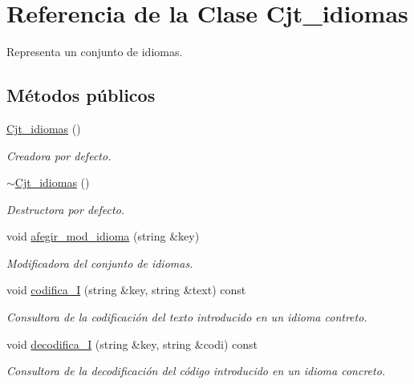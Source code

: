 \hypertarget{class_cjt__idiomas}{}\section{Referencia de la Clase Cjt\+\_\+idiomas}
\label{class_cjt__idiomas}


Representa un conjunto de idiomas.  


\subsection*{Métodos públicos}
\begin{DoxyCompactItemize}
\item 
\hyperlink{class_cjt__idiomas_acf95ab4c8f5fc442e3724a804658dd38}{Cjt\+\_\+idiomas} ()
\begin{DoxyCompactList}\small\item\em Creadora por defecto. \end{DoxyCompactList}\item 
\hyperlink{class_cjt__idiomas_acd4deb8546959ab728ce5c4bc717e800}{$\sim$\+Cjt\+\_\+idiomas} ()
\begin{DoxyCompactList}\small\item\em Destructora por defecto. \end{DoxyCompactList}\item 
void \hyperlink{class_cjt__idiomas_a1e38b16ba4bb49a91589c85ec7775a5f}{afegir\+\_\+mod\+\_\+idioma} (string \&key)
\begin{DoxyCompactList}\small\item\em Modificadora del conjunto de idiomas. \end{DoxyCompactList}\item 
void \hyperlink{class_cjt__idiomas_af3724a3343435acc48397c555722ce2f}{codifica\+\_\+I} (string \&key, string \&text) const
\begin{DoxyCompactList}\small\item\em Consultora de la codificación del texto introducido en un idioma contreto. \end{DoxyCompactList}\item 
void \hyperlink{class_cjt__idiomas_a99a44238cc4b83392ff1991ad1319c46}{decodifica\+\_\+I} (string \&key, string \&codi) const
\begin{DoxyCompactList}\small\item\em Consultora de la decodificación del código introducido en un idioma concreto. \end{DoxyCompactList}\item 

\end{DoxyCompactItemize}
